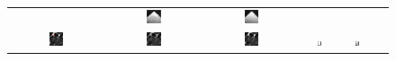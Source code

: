 \documentclass[twocolumn,oneside]{IEEEtran/IEEEtran}
\begin{document}
\begin{figure}[htbp]
\begin{tabular}{cccccc}
                                                                                                                      & \includegraphics[width=0.16\textwidth]{figures-SBA/anothergrating_40mu_zoomin}
                                                                                                                                                       & \includegraphics[width=0.16\textwidth]{figures-SBA/anothergrating_bptv_40mu_zoomin}	\\
    \includegraphics[width=0.16\textwidth]{figures-SBA/dnaforbptv_gt_framed}
                                   & \includegraphics[width=0.16\textwidth]{figures-SBA/dnaforbptv_40mu}		
                                                          & \includegraphics[width=0.16\textwidth]{figures-SBA/dnaforbptv_bptv_40mu}	
                                                                                 & \includegraphics[width=0.16\textwidth]{figures-SBA/dnaforbptv_gt_zoomin}	
                                                                                                                      & \includegraphics[width=0.16\textwidth]{figures-SBA/dnaforbptv_40mu_zoomin}

\end{tabular}
\end{figure}
\end{document}
